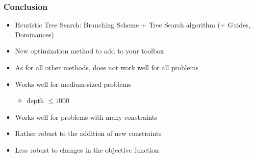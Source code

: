 \documentclass[10pt]{beamer}
\begin{document}
\begin{frame}
  \frametitle{Conclusion}

  \begin{itemize}
    \item Heuristic Tree Search: Branching Scheme + Tree Search algorithm (+ Guides, Dominances)
    \item New optimization method to add to your toolbox
    \item As for all other methods, does not work well for all problems
    \item Works well for medium-sized problems
      \begin{itemize}
        \item depth $\le 1000$
      \end{itemize}
    \item Works well for problems with many constraints
    \item Rather robust to the addition of new constraints
    \item Less robust to changes in the objective function
  \end{itemize}
\end{frame}

\maketitle
\end{document}
